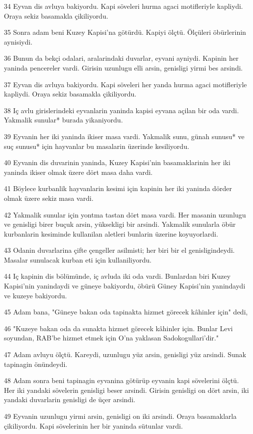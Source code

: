 \par 34 Eyvan dis avluya bakiyordu. Kapi söveleri hurma agaci motifleriyle kapliydi. Oraya sekiz basamakla çikiliyordu.
\par 35 Sonra adam beni Kuzey Kapisi'na götürdü. Kapiyi ölçtü. Ölçüleri öbürlerinin aynisiydi.
\par 36 Bunun da bekçi odalari, aralarindaki duvarlar, eyvani ayniydi. Kapinin her yaninda pencereler vardi. Girisin uzunlugu elli arsin, genisligi yirmi bes arsindi.
\par 37 Eyvan dis avluya bakiyordu. Kapi söveleri her yanda hurma agaci motifleriyle kapliydi. Oraya sekiz basamakla çikiliyordu.
\par 38 Iç avlu girislerindeki eyvanlarin yaninda kapisi eyvana açilan bir oda vardi. Yakmalik sunular* burada yikaniyordu.
\par 39 Eyvanin her iki yaninda ikiser masa vardi. Yakmalik sunu, günah sunusu* ve suç sunusu* için hayvanlar bu masalarin üzerinde kesiliyordu.
\par 40 Eyvanin dis duvarinin yaninda, Kuzey Kapisi'nin basamaklarinin her iki yaninda ikiser olmak üzere dört masa daha vardi.
\par 41 Böylece kurbanlik hayvanlarin kesimi için kapinin her iki yaninda dörder olmak üzere sekiz masa vardi.
\par 42 Yakmalik sunular için yontma tastan dört masa vardi. Her masanin uzunlugu ve genisligi birer buçuk arsin, yüksekligi bir arsindi. Yakmalik sunularla öbür kurbanlarin kesiminde kullanilan aletleri bunlarin üzerine koyuyorlardi.
\par 43 Odanin duvarlarina çifte çengeller asilmisti; her biri bir el genisligindeydi. Masalar sunulacak kurban eti için kullaniliyordu.
\par 44 Iç kapinin dis bölümünde, iç avluda iki oda vardi. Bunlardan biri Kuzey Kapisi'nin yanindaydi ve güneye bakiyordu, öbürü Güney Kapisi'nin yanindaydi ve kuzeye bakiyordu.
\par 45 Adam bana, "Güneye bakan oda tapinakta hizmet görecek kâhinler için" dedi,
\par 46 "Kuzeye bakan oda da sunakta hizmet görecek kâhinler için. Bunlar Levi soyundan, RAB'be hizmet etmek için O'na yaklasan Sadokogullari'dir."
\par 47 Adam avluyu ölçtü. Kareydi, uzunlugu yüz arsin, genisligi yüz arsindi. Sunak tapinagin önündeydi.
\par 48 Adam sonra beni tapinagin eyvanina götürüp eyvanin kapi sövelerini ölçtü. Her iki yandaki sövelerin genisligi beser arsindi. Girisin genisligi on dört arsin, iki yandaki duvarlarin genisligi de üçer arsindi.
\par 49 Eyvanin uzunlugu yirmi arsin, genisligi on iki arsindi. Oraya basamaklarla çikiliyordu. Kapi sövelerinin her bir yaninda sütunlar vardi.

